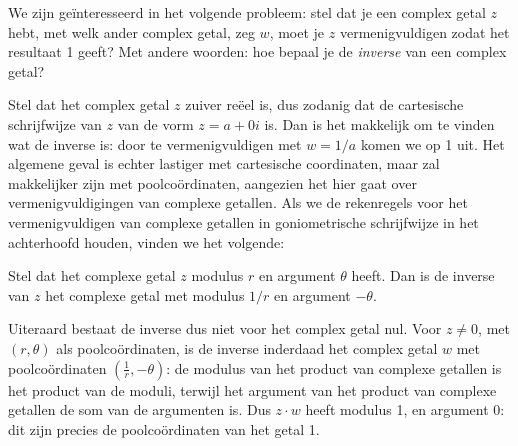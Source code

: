 \documentclass{ximera}
\begin{document}
\begin{xmuitweiding}
We zijn geïnteresseerd in het volgende probleem: stel dat je een complex getal $z$ hebt, met welk ander complex getal, zeg $w$, moet je $z$ vermenigvuldigen zodat het resultaat 1 geeft? Met andere woorden: hoe bepaal je de \textit{inverse} van een complex getal?

Stel dat het complex getal $z$ zuiver reëel is, dus zodanig dat de cartesische schrijfwijze van $z$ van de vorm $z = a + 0i$ is. Dan is het makkelijk om te vinden wat de inverse is: door te vermenigvuldigen met $w = 1/a$ komen we op 1 uit. Het algemene geval is echter lastiger met cartesische coordinaten, 
maar zal makkelijker zijn met poolcoördinaten, aangezien het hier gaat over vermenigvuldigingen van complexe getallen. Als we de rekenregels voor het vermenigvuldigen van complexe getallen in goniometrische schrijfwijze in het achterhoofd houden, vinden we het volgende:

\begin{proposition}
Stel dat het complexe getal $z$ modulus $r$ en argument $\theta$ heeft. Dan is de inverse van $z$ het complexe getal met modulus $1/r$ en argument $-\theta$.  
\end{proposition}

Uiteraard bestaat de inverse dus niet voor het complex getal nul. Voor $z\neq 0$, met $(r, \theta)$ als poolcoördinaten, is de inverse inderdaad het complex getal $w$ met poolcoördinaten $\left(\frac{1}{r}, -\theta\right)$: de modulus van het product van complexe getallen is het product van de moduli, terwijl het argument van het product van complexe getallen de som van de argumenten is. Dus $z\cdot w$ heeft modulus 1, en argument 0: dit zijn precies de poolcoördinaten van het getal 1.
\end{xmuitweiding}

\end{document}
